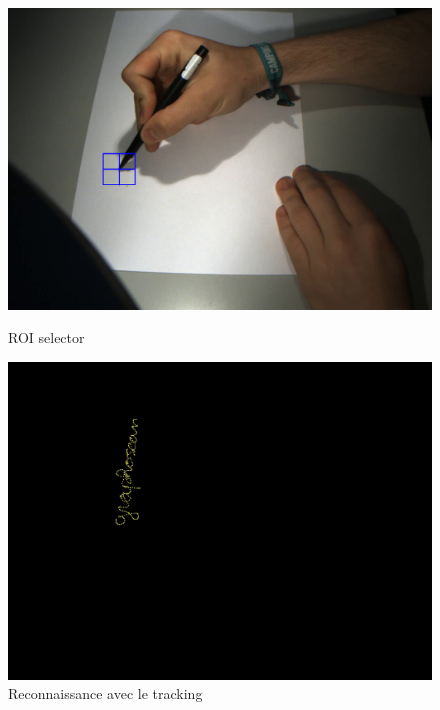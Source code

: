 \begin{figure}[htb]
\includegraphics[width=\textwidth]{Modules/Picture/roi}
\caption{ROI selector}
\label{ROI}
\vspace{30px}
\includegraphics[width=\textwidth]{Modules/Picture/tracking}
\caption{Reconnaissance avec le tracking}
\label{tracking}
\end{figure}

\newpage

